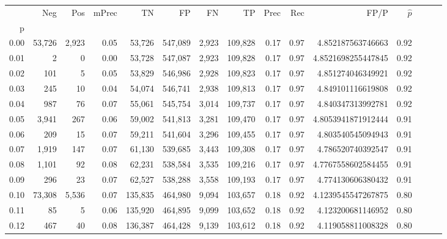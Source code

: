 \begin{tabular}{rrrrrrrrrrrrrrr}
\toprule
{} &     Neg &     Pos & mPrec &       TN &       FP &       FN &       TP &  Prec &   Rec &                  FP/P & $\hat{p}$ \\
p    &         &         &       &          &          &          &          &       &       &                       &           \\
\midrule
0.00 &  53,726 &   2,923 &  0.05 &   53,726 &  547,089 &    2,923 &  109,828 &  0.17 &  0.97 &     4.852187563746663 &      0.92 \\
0.01 &       2 &       0 &  0.00 &   53,728 &  547,087 &    2,923 &  109,828 &  0.17 &  0.97 &    4.8521698255447845 &      0.92 \\
0.02 &     101 &       5 &  0.05 &   53,829 &  546,986 &    2,928 &  109,823 &  0.17 &  0.97 &     4.851274046349921 &      0.92 \\
0.03 &     245 &      10 &  0.04 &   54,074 &  546,741 &    2,938 &  109,813 &  0.17 &  0.97 &     4.849101116619808 &      0.92 \\
0.04 &     987 &      76 &  0.07 &   55,061 &  545,754 &    3,014 &  109,737 &  0.17 &  0.97 &     4.840347313992781 &      0.92 \\
0.05 &   3,941 &     267 &  0.06 &   59,002 &  541,813 &    3,281 &  109,470 &  0.17 &  0.97 &    4.8053941871912444 &      0.91 \\
0.06 &     209 &      15 &  0.07 &   59,211 &  541,604 &    3,296 &  109,455 &  0.17 &  0.97 &     4.803540545094943 &      0.91 \\
0.07 &   1,919 &     147 &  0.07 &   61,130 &  539,685 &    3,443 &  109,308 &  0.17 &  0.97 &     4.786520740392547 &      0.91 \\
0.08 &   1,101 &      92 &  0.08 &   62,231 &  538,584 &    3,535 &  109,216 &  0.17 &  0.97 &    4.7767558602584455 &      0.91 \\
0.09 &     296 &      23 &  0.07 &   62,527 &  538,288 &    3,558 &  109,193 &  0.17 &  0.97 &     4.774130606380432 &      0.91 \\
0.10 &  73,308 &   5,536 &  0.07 &  135,835 &  464,980 &    9,094 &  103,657 &  0.18 &  0.92 &    4.1239545547267875 &      0.80 \\
0.11 &      85 &       5 &  0.06 &  135,920 &  464,895 &    9,099 &  103,652 &  0.18 &  0.92 &     4.123200681146952 &      0.80 \\
0.12 &     467 &      40 &  0.08 &  136,387 &  464,428 &    9,139 &  103,612 &  0.18 &  0.92 &     4.119058811008328 &      0.80 \\

\end{tabular}
